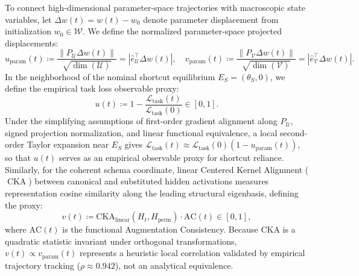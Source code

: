 \documentclass{article}
\theoremstyle{plain}
\theoremstyle{definition}
\DeclareMathOperator{\CKA}{CKA}
\begin{document}
To connect high-dimensional parameter-space trajectories with macroscopic state variables, let $\Delta w(t) = w(t) - w_0$ denote parameter displacement from initialization $w_0 \in \mathcal{W}$. We define the normalized parameter-space projected displacements:
\begin{equation}
    u_{\text{param}}(t) \coloneqq \frac{\| P_{\mathcal{U}} \Delta w(t) \|}{\sqrt{\dim(\mathcal{U})}} = |\hat{e}_{\mathcal{U}}^\top \Delta w(t)|, \quad v_{\text{param}}(t) \coloneqq \frac{\| P_{\mathcal{V}} \Delta w(t) \|}{\sqrt{\dim(\mathcal{V})}} = |\hat{e}_{\mathcal{V}}^\top \Delta w(t)|.
    \label{eq:app_param_displacements}
\end{equation}
In the neighborhood of the nominal shortcut equilibrium $E_S = (\theta_S, 0)$, we define the empirical task loss observable proxy:
\begin{equation}
    u(t) \coloneqq 1 - \frac{\mathcal{L}_{\text{task}}(t)}{\mathcal{L}_{\text{task}}(0)} \in [0, 1].
\end{equation}
Under the simplifying assumptions of first-order gradient alignment along $P_{\mathcal{U}}$, signed projection normalization, and linear functional equivalence, a local second-order Taylor expansion near $E_S$ gives $\mathcal{L}_{\text{task}}(t) \approx \mathcal{L}_{\text{task}}(0)(1 - u_{\text{param}}(t))$, so that $u(t)$ serves as an empirical observable proxy for shortcut reliance. Similarly, for the coherent schema coordinate, linear Centered Kernel Alignment ($\CKA$) between canonical and substituted hidden activations measures representation cosine similarity along the leading structural eigenbasis, defining the proxy:
\begin{equation}
    v(t) \coloneqq \text{CKA}_{\text{linear}}(H_t, H_{\text{perm}}) \cdot \text{AC}(t) \in [0, 1],
\end{equation}
where $\text{AC}(t)$ is the functional Augmentation Consistency. Because CKA is a quadratic statistic invariant under orthogonal transformations, $v(t) \propto v_{\text{param}}(t)$ represents a heuristic local correlation validated by empirical trajectory tracking ($\rho \approx 0.942$), not an analytical equivalence.
\end{document}
